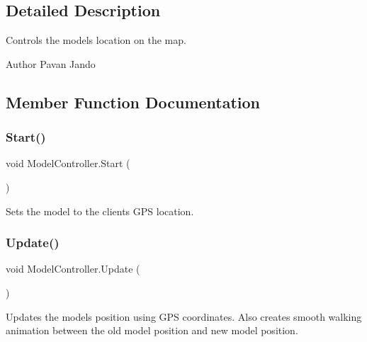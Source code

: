\subsection{Detailed Description}
Controls the models location on the map. 

\begin{DoxyAuthor}{Author}
Pavan Jando
\end{DoxyAuthor}


\subsection{Member Function Documentation}
\mbox{\label{class_model_controller_aeb277810748a80f9a3b9478d92c91b7b}} 
\subsubsection{\texorpdfstring{Start()}{Start()}}
{\footnotesize\ttfamily void Model\+Controller.\+Start (\begin{DoxyParamCaption}{ }\end{DoxyParamCaption})\hspace{0.3cm}{\ttfamily [private]}}



Sets the model to the clients G\+PS location. 

\mbox{\label{class_model_controller_a267847d6963134144ac1e99e5dcff936}} 
\subsubsection{\texorpdfstring{Update()}{Update()}}
{\footnotesize\ttfamily void Model\+Controller.\+Update (\begin{DoxyParamCaption}{ }\end{DoxyParamCaption})\hspace{0.3cm}{\ttfamily [private]}}



Updates the models position using G\+PS coordinates. Also creates smooth walking animation between the old model position and new model position. 



